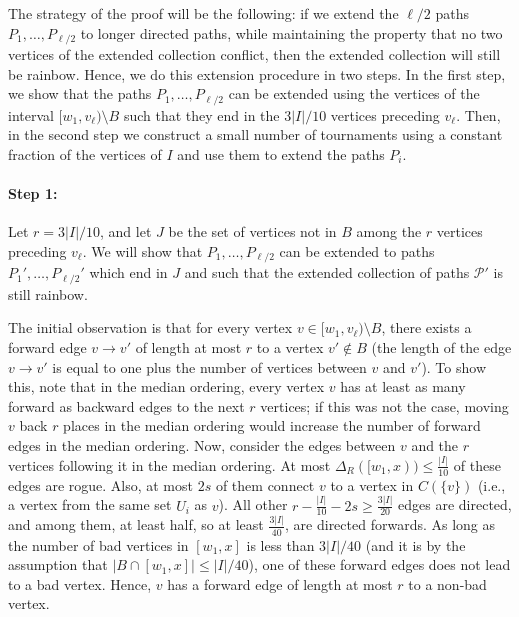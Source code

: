 \documentclass[a4paper,11pt]{article}
\makeatletter
\renewenvironment{proof}[1][\proofname] {\par\pushQED{\qed}\normalfont\topsep6\p@\@plus6\p@\relax\trivlist\item[\hskip\labelsep\bfseries#1\@addpunct{.}]\ignorespaces}{\popQED\endtrivlist\@endpefalse}
\theoremstyle{definition}
\def\cP{\mathcal{P}}
\makeatother
\begin{document}
\begin{proof}
The strategy of the proof will be the following: if we extend the $\ell/2$ paths $P_1, \dots, P_{\ell/2}$ to longer directed paths, while maintaining the property that no two vertices of the extended collection conflict, then the extended collection will still be rainbow. Hence, we do this extension procedure in two steps. In the first step, we show that the paths $P_1, \dots, P_{\ell/2}$ can be extended using the vertices of the interval $[w_1, v_{\ell})\setminus B$ such that they end in the $3|I|/10$ vertices preceding $v_\ell$. Then, in the second step we construct a small number of tournaments using a constant fraction of the vertices of $I$ and use them to extend the paths $P_i$. 

\paragraph{Step 1:} Let $r=3|I|/10$, and let $J$ be the set of vertices not in $B$ among the $r$ vertices preceding $v_\ell$. We will show that $P_1, \dots, P_{\ell/2}$ can be extended to paths $P_1', \dots, P_{\ell/2}'$ which end in $J$ and such that the extended collection of paths $\cP'$ is still rainbow.

The initial observation is that for every vertex $v\in [w_1, v_\ell)\setminus B$, there exists a forward edge $v\to v'$ of length at most $r$ to a vertex $v'\notin B$ (the length of the edge $v\to v'$ is equal to one plus the number of vertices between $v$ and $v'$). To show this, note that in the median ordering, every vertex $v$ has at least as many forward as backward edges to the next $r$ vertices; if this was not the case, moving $v$ back $r$ places in the median ordering would increase the number of forward edges in the median ordering. 
Now, consider the edges between $v$ and the $r$ vertices following it in the median ordering. At most $\Delta_R([w_1,x)) \leq \frac{|I|}{10}$ of these edges are rogue. Also, at most $2s$ of them connect $v$ to a vertex in $C(\{v\})$ (i.e., a vertex from the same set $U_i$ as $v$). All other $r - \frac{|I|}{10} - 2s \geq \frac{3|I|}{20}$ edges are directed, and among them, at least half, so at least $\frac{3|I|}{40}$, are directed forwards.  
As long as the number of bad vertices in $[w_1, x]$ is less than $3|I|/40$ (and it is by the assumption that $|B\cap [w_1, x]|\leq |I|/40$), one of these forward edges does not lead to a bad vertex. 
Hence, $v$ has a forward edge of length at most $r$ to a non-bad vertex.


\end{proof}
\end{document}
